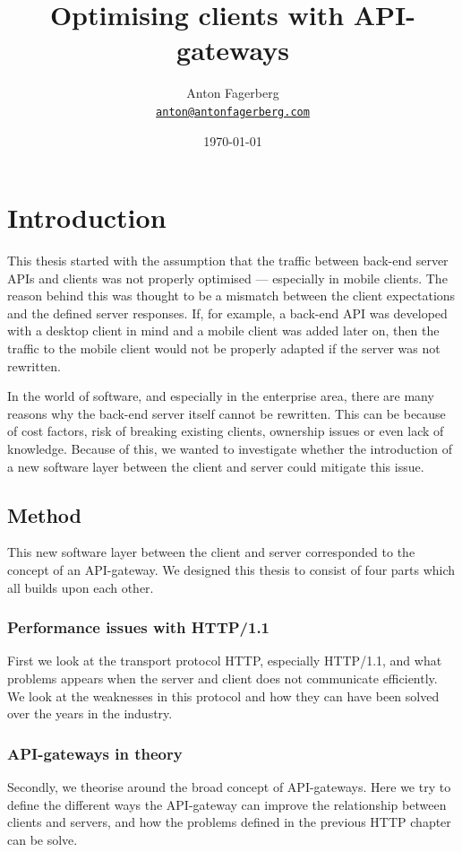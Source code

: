 \documentclass{cslthse-msc}
\author{
	Anton Fagerberg \\
	{\normalsize \href{mailto:anton@antonfagerberg.com}{\texttt{anton@antonfagerberg.com}}}
}
\title{Optimising clients with API-gateways}
\subtitle{}
\date{\today}
\begin{document}
\makefrontmatter

\chapter{Introduction}
This thesis started with the assumption that the traffic between back-end server APIs and clients was not properly optimised --- especially in mobile clients. The reason behind this was thought to be a mismatch between the client expectations and the defined server responses. If, for example, a back-end API was developed with a desktop client in mind and a mobile client was added later on, then the traffic to the mobile client would not be properly adapted if the server was not rewritten.

In the world of software, and especially in the enterprise area, there are many reasons why the back-end server itself cannot be rewritten. This can be because of cost factors, risk of breaking existing clients, ownership issues or even lack of knowledge. Because of this, we wanted to investigate whether the introduction of a new software layer between the client and server could mitigate this issue.

\section{Method}

This new software layer between the client and server corresponded to the concept of an API-gateway. We designed this thesis to consist of four parts which all builds upon each other. 

\subsection{Performance issues with HTTP/1.1}
First we look at the transport protocol HTTP, especially HTTP/1.1, and what problems appears when the server and client does not communicate efficiently. We look at the weaknesses in this protocol and how they can have been solved over the years in the industry.

\subsection{API-gateways in theory}
Secondly, we theorise around the broad concept of API-gateways. Here we try to define the different ways the API-gateway can improve the relationship between clients and servers, and how the problems defined in the previous HTTP chapter can be solve.
\end{document}
